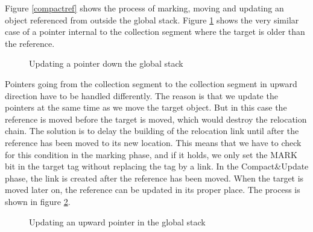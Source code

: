 Figure \ref{compactref} shows the process of marking, moving and
updating an object referenced from outside the global stack.
Figure \ref{compactdown} shows the very similar case of a pointer internal to
the collection segment where the target is older than the reference.

\begin{figure}
\caption{Updating a pointer down the global stack}
\label{compactdown}
\end{figure}

Pointers going from the collection segment to the collection segment
in upward direction have to be handled differently.
The reason is that we update the pointers at the same time as we move
the target object.
But in this case the reference is moved before the target is moved, which
would destroy the relocation chain.
The solution is to delay the building of the relocation link until
after the reference has been moved to its new location.
This means that we have to check for this condition in the
marking phase, and if it holds, we only set the MARK bit in the target
tag without replacing the tag by a link.
In the Compact\&Update phase, the link is created after the reference
has been moved. When the target is moved later on, the reference
can be updated in its proper place.
The process is shown in figure \ref{compactup}.

\begin{figure}
\caption{Updating an upward pointer in the global stack}
\label{compactup}
\end{figure}

